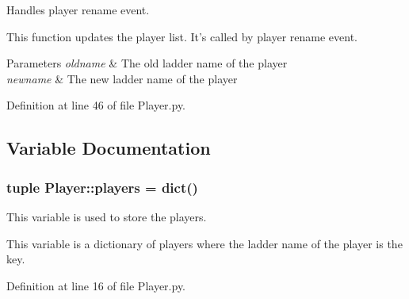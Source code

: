 \-Handles player rename event. 

\-This function updates the player list. \-It's called by player rename event. 
\begin{DoxyParams}{\-Parameters}
{\em oldname} & \-The old ladder name of the player \\
\hline
{\em newname} & \-The new ladder name of the player \\
\hline
\end{DoxyParams}


\-Definition at line 46 of file \-Player.\-py.



\subsection{\-Variable \-Documentation}
\hypertarget{namespace_player_a7e698ad170545a386150e105894f090e}{
\subsubsection[{players}]{\setlength{\rightskip}{0pt plus 5cm}tuple {\bf \-Player\-::players} = dict()}}
\label{namespace_player_a7e698ad170545a386150e105894f090e}


\-This variable is used to store the players. 

\-This variable is a dictionary of players where the ladder name of the player is the key. 

\-Definition at line 16 of file \-Player.\-py.

